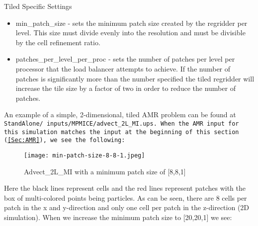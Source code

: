 

Tiled Specific Settings 
\begin{itemize}
\item min\_patch\_size - sets the minimum patch size created by the
  regridder per level. This size must divide evenly into the
  resolution and must be divisible by the cell refinement ratio.
\item patches\_per\_level\_per\_proc - sets the number of patches per
  level per processor that the load balancer attempts to achieve. If
  the number of patches is significantly more than the number
  specified the tiled regridder will increase the tile size by a
  factor of two in order to reduce the number of patches.
\end{itemize}

An example of a simple, 2-dimensional, tiled AMR problem can be found at \tt StandAlone/
inputs/MPMICE/advect\_2L\_MI.ups. \normalfont When the AMR input for this simulation matches the input at the beginning of this section (\ref{Sec:AMR}), we see the following: 

\begin{figure}[H]
  \centering
  \texttt{[image: min-patch-size-8-8-1.jpeg]}
  \caption{Advect\_2L\_MI with a minimum patch size of [8,8,1]}
  \label{fig:881}
\end{figure}

Here the black lines represent cells and the red lines represent patches with the box of multi-colored points being particles. As can be seen, there are 8 cells per patch in the x and y-direction and only one cell per patch in the z-direction (2D simulation). When we increase the minimum patch size to [20,20,1] we see:

